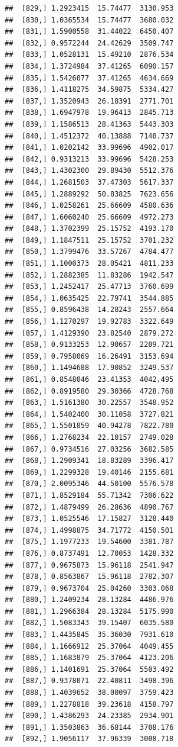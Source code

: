 \documentclass[article]{jss}\usepackage[]{graphicx}\usepackage[]{xcolor}
\makeatletter
\newenvironment{kframe}{%
 \def\at@end@of@kframe{}%
 \ifinner\ifhmode%
  \def\at@end@of@kframe{\end{minipage}}%
  \begin{minipage}{\columnwidth}%
 \fi\fi%
 \def\FrameCommand##1{\hskip\@totalleftmargin \hskip-\fboxsep
 \colorbox{shadecolor}{##1}\hskip-\fboxsep
     \hskip-\linewidth \hskip-\@totalleftmargin \hskip\columnwidth}%
 \MakeFramed {\advance\hsize-\width
   \@totalleftmargin\z@ \linewidth\hsize
   \@setminipage}}%
 {\par\unskip\endMakeFramed%
 \at@end@of@kframe}
\newenvironment{knitrout}{}{} %
\makeatother
\begin{document}
\begin{knitrout}
\begin{kframe}
\begin{verbatim}
##  [829,] 1.2923415  15.74477  3130.953
##  [830,] 1.0365534  15.74477  3680.032
##  [831,] 1.5900558  31.44022  6450.407
##  [832,] 0.9572244  24.42629  3509.747
##  [833,] 1.0528131  15.49210  2876.534
##  [834,] 1.3724984  37.41265  6090.157
##  [835,] 1.5426077  37.41265  4634.669
##  [836,] 1.4118275  34.59875  5334.427
##  [837,] 1.3520943  26.18391  2771.701
##  [838,] 1.6947978  19.96413  2845.713
##  [839,] 1.1586513  28.41363  5443.303
##  [840,] 1.4512372  40.13888  7140.737
##  [841,] 1.0202142  33.99696  4902.017
##  [842,] 0.9313213  33.99696  5428.253
##  [843,] 1.4302300  29.89430  5512.376
##  [844,] 1.2681503  37.47303  5617.337
##  [845,] 1.2889292  50.83825  7623.656
##  [846,] 1.0258261  25.66609  4580.636
##  [847,] 1.6060240  25.66609  4972.273
##  [848,] 1.3702399  25.15752  4193.170
##  [849,] 1.1847511  25.15752  3701.232
##  [850,] 1.3799476  33.57267  4784.477
##  [851,] 1.1000373  28.05421  4811.233
##  [852,] 1.2882385  11.83286  1942.547
##  [853,] 1.2452417  25.47713  3760.699
##  [854,] 1.0635425  22.79741  3544.885
##  [855,] 0.8596438  14.28243  2557.664
##  [856,] 1.1270297  19.92783  3322.649
##  [857,] 1.4129390  23.82540  2879.272
##  [858,] 0.9133253  12.90657  2209.721
##  [859,] 0.7958069  16.26491  3153.694
##  [860,] 1.1494688  17.90852  3249.537
##  [861,] 0.8548046  23.41353  4042.495
##  [862,] 0.8919580  29.30366  4728.768
##  [863,] 1.5161380  30.22557  3548.952
##  [864,] 1.5402400  30.11058  3727.821
##  [865,] 1.5501859  40.94278  7822.780
##  [866,] 1.2768234  22.10157  2749.028
##  [867,] 0.9734516  27.03256  3682.585
##  [868,] 1.2909341  18.83289  3396.417
##  [869,] 1.2299328  19.40146  2155.681
##  [870,] 2.0095346  44.50100  5576.578
##  [871,] 1.8529184  55.71342  7306.622
##  [872,] 1.4879499  26.28636  4890.767
##  [873,] 1.0525546  17.15827  3128.440
##  [874,] 1.4998875  34.71772  4150.501
##  [875,] 1.1977233  19.54600  3381.787
##  [876,] 0.8737491  12.70053  1428.332
##  [877,] 0.9675873  15.96118  2541.947
##  [878,] 0.8563867  15.96118  2782.307
##  [879,] 0.9673704  25.04260  3303.068
##  [880,] 1.2409234  28.13284  4486.976
##  [881,] 1.2966384  28.13284  5175.990
##  [882,] 1.5083343  39.15407  6035.580
##  [883,] 1.4435845  35.36030  7931.610
##  [884,] 1.1666912  25.37064  4049.455
##  [885,] 1.1683879  25.37064  4123.206
##  [886,] 1.1401691  25.37064  5503.492
##  [887,] 0.9378071  22.40811  3498.396
##  [888,] 1.4039652  38.00097  3759.423
##  [889,] 1.2278818  39.23618  4158.797
##  [890,] 1.4386293  24.23385  2934.901
##  [891,] 1.3503863  36.68144  3708.176
##  [892,] 1.9056117  37.96339  3008.718

\end{verbatim}
\end{kframe}
\end{knitrout}
\end{document}
